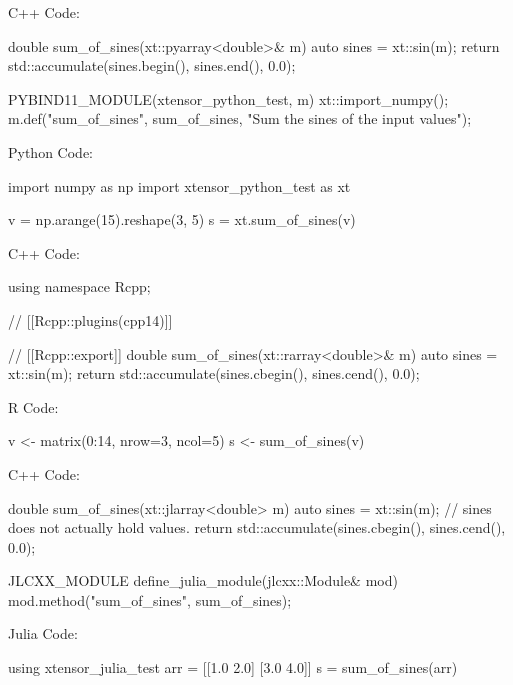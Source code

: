 \documentclass{beamer}
\begin{document}
\begin{frame}[fragile]
C++ Code:
\begin{cppcode}
double sum_of_sines(xt::pyarray<double>& m)
{
    auto sines = xt::sin(m);
    return std::accumulate(sines.begin(), sines.end(), 0.0);
}

PYBIND11_MODULE(xtensor_python_test, m)
{
    xt::import_numpy();
    m.def("sum_of_sines", sum_of_sines, "Sum the sines of the input values");
}
\end{cppcode}

Python Code:
\begin{pythoncode}
import numpy as np
import xtensor_python_test as xt

v = np.arange(15).reshape(3, 5)
s = xt.sum_of_sines(v)
\end{pythoncode}
\end{frame}


\begin{frame}[fragile]
C++ Code:
\begin{cppcode}
using namespace Rcpp;

// [[Rcpp::plugins(cpp14)]]

// [[Rcpp::export]]
double sum_of_sines(xt::rarray<double>& m)
{
    auto sines = xt::sin(m);
    return std::accumulate(sines.cbegin(), sines.cend(), 0.0);
}
\end{cppcode}

R Code:
\begin{rcode}
v <- matrix(0:14, nrow=3, ncol=5)
s <- sum_of_sines(v)

\end{rcode}
\end{frame}


\begin{frame}[fragile]
C++ Code:
\begin{cppcode}
double sum_of_sines(xt::jlarray<double> m)
{
    auto sines = xt::sin(m);  // sines does not actually hold values.
    return std::accumulate(sines.cbegin(), sines.cend(), 0.0);
}

JLCXX_MODULE define_julia_module(jlcxx::Module& mod)
{
    mod.method("sum_of_sines", sum_of_sines);
}
\end{cppcode}

Julia Code:
\begin{juliacode}
using xtensor_julia_test
arr = [[1.0 2.0]
       [3.0 4.0]]
s = sum_of_sines(arr)
\end{juliacode}
\end{frame}
\end{document}
